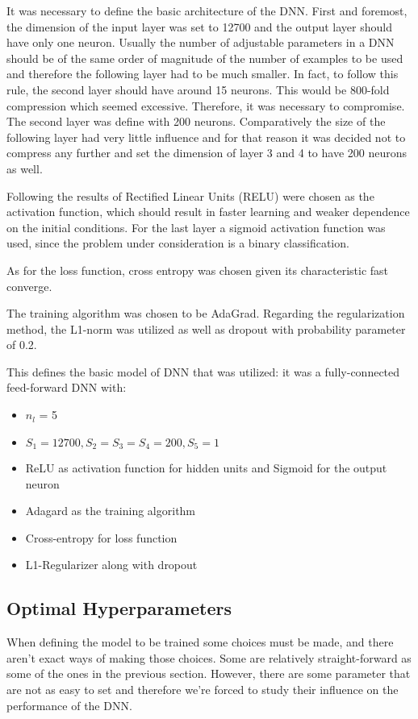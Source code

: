 It was necessary to define the basic architecture of the DNN. First and foremost, the dimension of the input layer was set to 12700 and the output layer should have only one neuron.
Usually the number of adjustable parameters in a DNN should be of the same order of magnitude of the number of examples to be used and therefore the following layer had to be much smaller. In fact, to follow this rule, the second layer should have around 15 neurons. This would be 800-fold compression which seemed excessive. Therefore, it was necessary to compromise. The second layer was define with 200 neurons. Comparatively the size of the following layer had very little influence and for that reason it was decided not to compress any further and set the dimension of layer 3 and 4 to have 200 neurons as well. 

Following the results of \cite{glorot2011deep} Rectified Linear Units (RELU) were chosen as the activation function, which should result in faster learning and weaker dependence on the initial conditions. For the last layer a sigmoid activation function was used, since the problem under consideration is a binary classification.

As for the loss function, cross entropy was chosen given its characteristic fast converge.

The training algorithm was chosen to be AdaGrad.
Regarding the regularization method, the L1-norm was utilized as well as dropout with probability parameter of 0.2.

This defines the basic model of DNN that was utilized: it was a fully-connected feed-forward DNN with:
\begin{itemize}
\item $n_l$ = 5
\item $S_1 = 12700, S_2=S_3=S_4 = 200, S_5=1$
\item ReLU as activation function for hidden units and Sigmoid for the output neuron
\item Adagard as the training algorithm
\item Cross-entropy for loss function
\item L1-Regularizer along with dropout
\end{itemize}

\subsection{Optimal Hyperparameters}
\label{subsec:hyperparameters}

When defining the model to be trained some choices must be made, and there aren't exact ways of making those choices. Some are relatively straight-forward as some of the ones in the previous section. However, there are some parameter that are not as easy to set and therefore we're forced to study their influence on the performance of the DNN.

